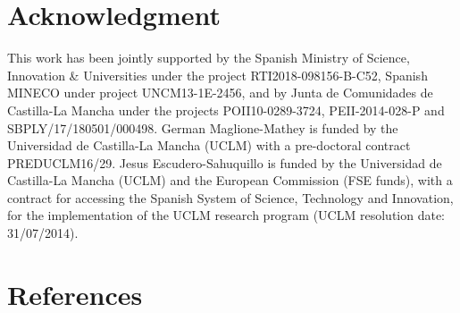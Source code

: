 \documentclass[review]{elsarticle}
\newcommand{\dflys}{Dragonflies}
\newcommand{\ib}{IB}
\begin{document}


\section*{Acknowledgment}
This work has been jointly supported by the Spanish Ministry of Science, Innovation \& Universities under the project RTI2018-098156-B-C52,
Spanish MINECO under project UNCM13-1E-2456, and by Junta de Comunidades de Castilla-La Mancha under the projects POII10-0289-3724, PEII-2014-028-P and SBPLY/17/180501/000498.
German Maglione-Mathey is funded by the Universidad de Castilla-La Mancha (UCLM)  with a pre-doctoral contract PREDUCLM16/29.
Jesus Escudero-Sahuquillo is funded by the Universidad de Castilla-La Mancha (UCLM) and the European Commission (FSE funds),
with a contract for accessing the Spanish System of Science, Technology and Innovation, for the implementation of the UCLM
research program (UCLM resolution date: 31/07/2014).


\section*{References}


\end{document}
